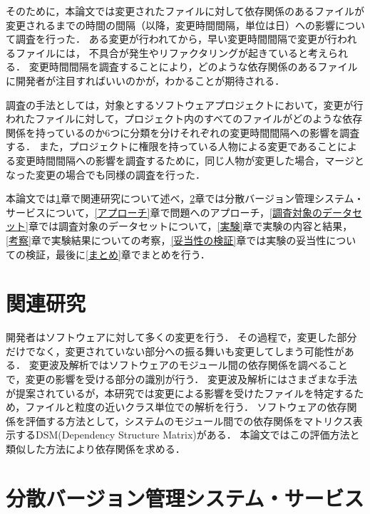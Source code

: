 \documentclass{fose2016}           %
\begin{document}
そのために，本論文では変更されたファイルに対して依存関係のあるファイルが変更されるまでの時間の間隔（以降，変更時間間隔，単位は日）への影響について調査を行った．
ある変更が行われてから，早い変更時間間隔で変更が行われるファイルには， 不具合が発生やリファクタリングが起きていると考えられる．
変更時間間隔を調査することにより，どのような依存関係のあるファイルに開発者が注目すればいいのかが，わかることが期待される．

調査の手法としては，対象とするソフトウェアプロジェクトにおいて，変更が行われたファイルに対して，プロジェクト内のすべてのファイルがどのような依存関係を持っているのか6つに分類を分けそれぞれの変更時間間隔への影響を調査する．
また，プロジェクトに権限を持っている人物による変更であることによる変更時間間隔への影響を調査するために，同じ人物が変更した場合，マージとなった変更の場合でも同様の調査を行った．

本論文では\ref{関連研究}章で関連研究について述べ，\ref{ツール・サービス}章では分散バージョン管理システム・サービスについて，\ref{アプローチ}章で問題へのアプローチ，\ref{調査対象のデータセット}章では調査対象のデータセットについて，\ref{実験}章で実験の内容と結果，\ref{考察}章で実験結果についての考察，\ref{妥当性の検証}章では実験の妥当性についての検証，最後に\ref{まとめ}章でまとめを行う．


\section{関連研究}\label{関連研究}
開発者はソフトウェアに対して多くの変更を行う．
その過程で，変更した部分だけでなく，変更されていない部分への振る舞いも変更してしまう可能性がある．
変更波及解析ではソフトウェアのモジュール間の依存関係を調べることで，変更の影響を受ける部分の識別が行う．
変更波及解析にはさまざまな手法が提案されているが\cite{Ryder,Kondo}，本研究では変更による影響を受けたファイルを特定するため，ファイルと粒度の近いクラス単位での解析\cite{Ryder}を行う．
ソフトウェアの依存関係を評価する方法として，システムのモジュール間での依存関係をマトリクス表示するDSM(Dependency Structure Matrix)がある\cite{Nord}．
本論文ではこの評価方法と類似した方法により依存関係を求める．

\section{分散バージョン管理システム・サービス}\label{ツール・サービス}
\end{document}
